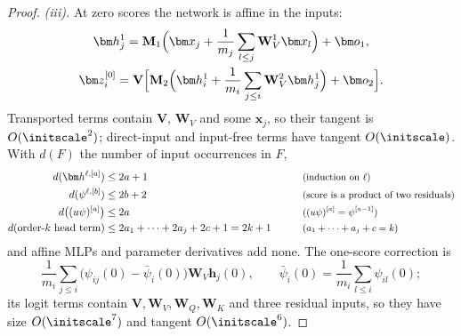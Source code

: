 \begin{proof}
\emph{(iii).} At zero scores the network is affine in the inputs:
\begin{gather*}
 \bm h^1_j=\mathbf M_1\Bigl(\bm x_j+\frac{1}{m_j}\sum_{l\le j}\mathbf W^1_V\bm x_l\Bigr)+\bm o_1,\\
 \bm z^{[0]}_i=\mathbf V\Bigl[\mathbf M_2\Bigl(\bm h^1_i+\frac{1}{m_i}\sum_{j\le i}\mathbf W^2_V\bm h^1_j\Bigr)+\bm o_2\Bigr].
\end{gather*}
Transported terms contain $\mathbf V$, $\mathbf W_V$ and some $\bm x_j$, so their tangent is $O(\initscale^2)$; direct-input and input-free terms have tangent $O(\initscale)$.
With $d(F)$ the number of input occurrences in $F$,
\begin{alignat*}{2}
 d(\bm h^{\ell,[a]})&\le2a+1 &\qquad& \why{induction on $\ell$}\\
 d(\psi^{\ell,[b]})&\le2b+2 && \why{score is a product of two residuals}\\
 d\bigl((u\psi)^{[a]}\bigr)&\le2a && \why{$(u\psi)^{[a]}=\psi^{[a-1]}$}\\
 d(\text{order-$k$ head term})&\le2a_1+\cdots+2a_j+2c+1=2k+1 && \why{$a_1+\cdots+a_j+c=k$}
\end{alignat*}
and affine MLPs and parameter derivatives add none. The one-score correction is
\[
 \frac{1}{m_i}\sum_{j\le i}\bigl(\psi_{ij}(0)-\bar\psi_i(0)\bigr)\mathbf W_V\bm h_j(0),\qquad \bar\psi_i(0)=\frac{1}{m_i}\sum_{l\le i}\psi_{il}(0);
\]
its logit terms contain $\mathbf V,\mathbf W_V,\mathbf W_Q,\mathbf W_K$ and three residual inputs, so they have size $O(\initscale^7)$ and tangent $O(\initscale^6)$.


\end{proof}
